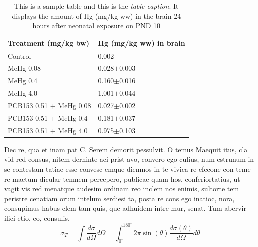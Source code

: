 \begin{table}[t]
\caption{This is a sample table and this is the \emph{table caption}. It displays the amount of Hg (mg/kg ww) in the brain 24 hours after neonatal exposure on PND 10}
\small
\begin{tabularx}{1\textwidth}{l X}
\toprule[0,5pt]
Treatment (mg/kg bw) & Hg (mg/kg ww) in brain\\
\midrule[0,5pt]
Control 					& 0.002\\
MeHg 0.08 				& 0.028\(\pm\)0.003\\
MeHg 0.4 					& 0.160\(\pm\)0.016\\
MeHg 4.0 					& 1.001\(\pm\)0.044\\
PCB153 0.51 + MeHg 0.08 	& 0.027\(\pm\)0.002\\
PCB153 0.51 + MeHg 0.4 	& 0.181\(\pm\)0.037\\
PCB153 0.51 + MeHg 4.0 	& 0.975\(\pm\)0.103\\
\bottomrule[0,5pt]
\end{tabularx}%
\end{table}	

Dec re, qua et inam pat C. Serem demorit pessulvit. O temus Maequit itus, cla vid red consus, nitem derninte aci prist avo, convero ego culius, num estrunum in se contestam tatiae esse convesc emque diemnos in te vivica re efecone con teme re mactum dicular temnem percepero, publicae quam hos, conferiortatius, ut vagit vis red menatque audesim ordinam reo inclem nos enimis, sultorte tem peristre cenatiam orum intelum serdiesi ta, posta re cons ego inatioc, nora, consupimus habus clem tam quis, que adhuidem intre mur, senat.
Tum abervir ilici etio, eo, consulis.
\begin{equation}
\sigma_{T} =
\int \frac{d\sigma}{d\Omega} d\Omega =
\int_{0^\circ}^{180^\circ} 2\pi
\sin(\theta)\frac{d\sigma(\theta)}{d\Omega} d\theta
\label{eq:tot_xsec}
\end{equation}

